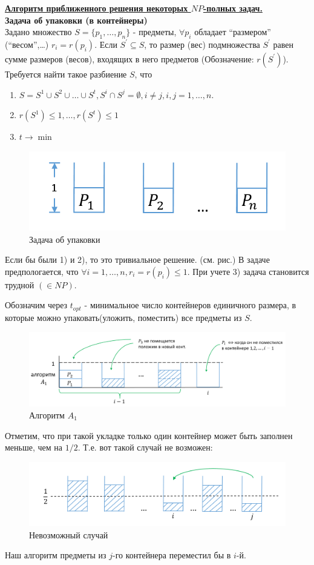 \documentclass{article}
\numberwithin{example}{section}
\numberwithin{question}{section}
\numberwithin{Remark}{section}
\numberwithin{theorem}{section}
\numberwithin{definition}{section}
\numberwithin{proposition}{section}
\begin{document}
\underline{\textbf{Алгоритм приближенного решения некоторых $NP$-полных задач.}}\\
\textbf{Задача об упаковки (в контейнеры)}\\
Задано множество $S=\{p_1,\ldots,p_n \}$ - предметы, $\forall p_i$ обладает ``размером'' (``весом'',\ldots) $r_i=r(p_i)$. Если $S^{'}\subseteq S$, то размер (вес) подмножества $S^{'}$ равен сумме размеров (весов), входящих в него предметов (Обозначение: $r(S^{'})$). Требуется найти такое разбиение $S$, что
\begin{enumerate}
	\item $S=S^{1}\cup S^{2}\cup\ldots\cup S^{t},S^{i}\cap S^{j}=\emptyset,i\ne j,i,j=1,\ldots,n.$
	\item $r(S^1)\leqslant 1,\ldots,r(S^t)\leqslant 1$
	\item $t\to \min$
\end{enumerate}
\begin{figure}[!htp]
	\centering
	\includegraphics[width=0.4\linewidth]{12-4}
	\caption{Задача об упаковки}
\end{figure}
Если бы были 1) и 2), то это тривиальное решение. (см. рис.) В задаче предпологается, что $\forall i=1,\ldots,n,r_i=r(p_i)\leqslant 1$. При учете 3) задача становится трудной $(\in NP)$. 

Обозначим через $t_{opt}$ - минимальное число контейнеров единичного размера, в которые можно упаковать(уложить, поместить) все предметы из $S$.
\begin{figure}[!htp]
	\centering
	\includegraphics[width=0.9\linewidth]{12-5}
	\caption{Алгоритм $A_1$}
\end{figure}
Отметим, что при такой укладке только один контейнер может быть заполнен меньше, чем на $1/2$. Т.е. вот такой случай не возможен:
\begin{figure}[!htp]
	\centering
	\includegraphics[width=0.7\linewidth]{12-6}
	\caption{Невозможный случай}
\end{figure}
Наш алгоритм предметы из $j$-го контейнера переместил бы в $i$-й.
\end{document}
